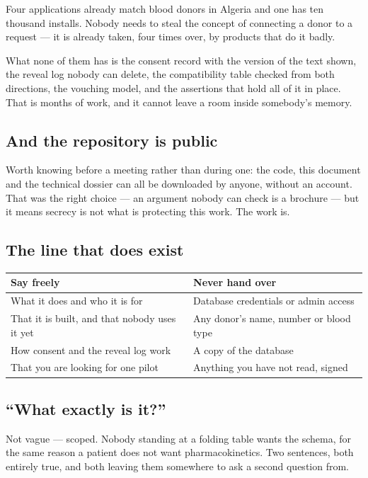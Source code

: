 \documentclass[11pt,a4paper]{article}
\begin{document}
Four applications already match blood donors in Algeria and one has ten
thousand installs. Nobody needs to steal the concept of connecting a donor to a
request --- it is already taken, four times over, by products that do it badly.

What none of them has is the consent record with the version of the text shown,
the reveal log nobody can delete, the compatibility table checked from both
directions, the vouching model, and the assertions that hold all of it in place.
That is months of work, and it cannot leave a room inside somebody's memory.

\subsection{And the repository is public}

Worth knowing before a meeting rather than during one: the code, this document
and the technical dossier can all be downloaded by anyone, without an account.
That was the right choice --- an argument nobody can check is a brochure --- but it
means secrecy is not what is protecting this work. The work is.

\subsection{The line that does exist}

\begin{center}
\begin{tabularx}{\textwidth}{@{}XX@{}}
\toprule
\textbf{Say freely} & \textbf{Never hand over} \\
\midrule
What it does and who it is for & Database credentials or admin access \\
That it is built, and that nobody uses it yet & Any donor's name, number or blood type \\
How consent and the reveal log work & A copy of the database \\
That you are looking for one pilot & Anything you have not read, signed \\
\bottomrule
\end{tabularx}
\end{center}

\subsection{``What exactly is it?''}

Not vague --- scoped. Nobody standing at a folding table wants the schema, for
the same reason a patient does not want pharmacokinetics. Two sentences, both
entirely true, and both leaving them somewhere to ask a second question from.
\end{document}

